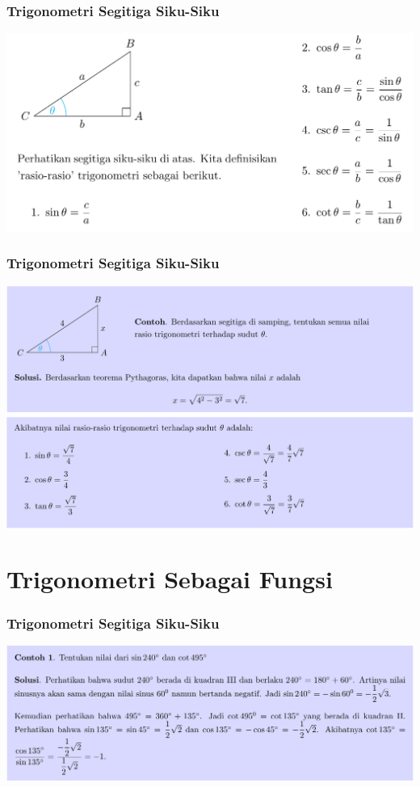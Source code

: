 \documentclass[pdflatex,compress,mathserif]{beamer}
\begin{document}
\begin{frame}
	\frametitle{Trigonometri Segitiga Siku-Siku}
	\begin{center}
		\includegraphics[width=\linewidth]{img/img03}
	\end{center}
\end{frame}

\begin{frame}
	\frametitle{Trigonometri Segitiga Siku-Siku}
	\begin{center}
		\includegraphics[width=\linewidth]{img/img04}
		\includegraphics[width=\linewidth]{img/img05}
	\end{center}
\end{frame}

\section{Trigonometri Sebagai Fungsi}

\begin{frame}
	\frametitle{Trigonometri Segitiga Siku-Siku}
	\begin{center}
		\includegraphics[width=\linewidth]{img/img06}
	\end{center}
\end{frame}
\end{document}
